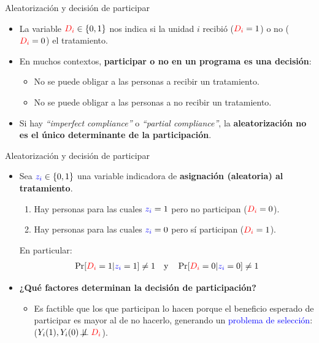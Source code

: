 \documentclass[10pt, xcolor=dvipsnames]{beamer}
\begin{document}
\begin{frame}{Aleatorización y decisión de participar}
\begin{itemize}\setlength{\itemsep}{1.0em}
    \item La variable $\textcolor{red}{D_i}\in \{0,1\}$ nos indica si la unidad $i$ recibió ($\textcolor{red}{D_i}=1$) o no ($\textcolor{red}{D_i}=0$) el tratamiento.
    \item En muchos contextos, \textbf{participar o no en un programa es una decisión}: 
    \begin{itemize}
        \item No se puede obligar a las personas a recibir un tratamiento.
        \item No se puede obligar a las personas a no recibir un tratamiento.
    \end{itemize}
    \item Si hay \textit{``imperfect compliance''} o \textit{``partial compliance''}, la \textbf{aleatorización no es el único determinante de la participación}. 
\end{itemize}	
\end{frame}


\begin{frame}{Aleatorización y decisión de participar}
	\begin{itemize}\setlength{\itemsep}{1.0em}
		\item Sea $\textcolor{blue}{z_i}\in \{0,1\}$ una variable indicadora de \textbf{asignación (aleatoria) al tratamiento}.
        \vspace{0.5em}
		\begin{enumerate}
			\item Hay personas para las cuales $\textcolor{blue}{z_i} =1$ pero no participan (\(\textcolor{red}{D_i}= 0\)).
			\item Hay personas para las cuales $\textcolor{blue}{z_i} =0$ pero sí participan (\(\textcolor{red}{D_i}= 1\)). \vspace{0.1cm}	
		\end{enumerate}
        En particular:
		\begin{align*}
		\Pr[\textcolor{red}{D_i}= 1|\textcolor{blue}{z_i} =1] \neq 1 \quad \text{y} \quad \Pr[\textcolor{red}{D_i}= 0|\textcolor{blue}{z_i} =0] \neq 1 
		\end{align*}
		\item \textbf{¿Qué factores determinan la decisión de participación?}
		\begin{itemize}
            \item Es factible que los que participan lo hacen porque el beneficio esperado de participar es mayor al de no hacerlo, generando un  \textcolor{blue}{problema de selección}: ($ Y_i(1),Y_i(0) \not\!\perp\!\!\!\perp \textcolor{red}{D_i}$). 
        \end{itemize}
	\end{itemize}	
\end{frame}
\end{document}
